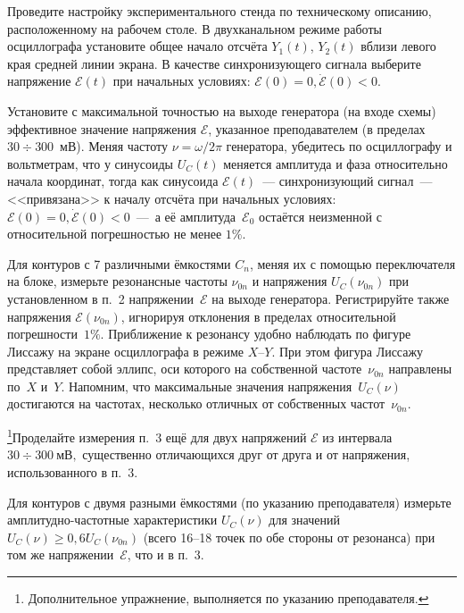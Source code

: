 \begin{lab:task}

\item Проведите настройку экспериментального стенда по техническому описанию, 
расположенному на рабочем столе. В двухканальном режиме работы
осциллографа установите общее начало отсчёта $Y_1(t)$, $Y_2(t)$ вблизи левого края
средней линии экрана. В качестве синхронизующего сигнала выберите напряжение
$\mathcal{E}(t)$ при начальных условиях: $\mathcal{E}(0)=0,
\dot{\mathcal{E}}(0)<0.$

    \item Установите с максимальной точностью на выходе генератора (на входе
схемы) эффективное значение напряжения $\mathcal{E}$, указанное преподавателем (в
пределах $30\div300$~мВ). Меняя частоту $\nu=\omega/2\pi$ генератора, убедитесь по
осциллографу и вольтметрам, что у синусоиды $U_C(t)$ меняется амплитуда и фаза
относительно начала координат, тогда как синусоида
$\mathcal{E}(t)$~--- синхронизующий сигнал~--- <<привязана>> к началу отсчёта
при начальных условиях: $\mathcal{E}(0)=0, \dot{\mathcal{E}}(0)<0$~---~а её
амплитуда~$\mathcal{E}_0$ остаётся неизменной с относительной погрешностью не
менее $1\%$. 

    \item Для контуров с 7 различными ёмкостями $C_n$, меняя их с помощью
переключателя на блоке, измерьте резонансные частоты $\nu_{0n}$ и напряжения
$U_C(\nu_{0n})$ при установленном в п.~2 напряжении~$\mathcal{E}$ на выходе
генератора. Регистрируйте также напряжения $\mathcal{E}(\nu_{0n})$, игнорируя
отклонения в пределах относительной погрешности~$1\%$. Приближение к резонансу
удобно наблюдать по фигуре Лиссажу на экране осциллографа в режиме $X$--$Y$.
При этом фигура Лиссажу представляет собой эллипс, оси которого на собственной
частоте~$\nu_{0n}$ направлены по~$X$ и~$Y$. 
Напомним, что максимальные значения напряжения~$U_C(\nu)$ достигаются на частотах, 
несколько отличных от собственных частот~$\nu_{0n}$.

    \item \footnote{Дополнительное упражнение, выполняется по указанию
        преподавателя.}Проделайте измерения п.~3 ещё
для двух напряжений $\mathcal{E}$ из интервала $30\div 300~мВ,$ существенно
отличающихся друг от друга и от напряжения, использованного в п.~3.

    \item Для контуров с двумя разными ёмкостями (по указанию преподавателя)
измерьте амплитудно-частотные характеристики $U_C(\nu)$ для значений
$U_C(\nu) \ge 0,6 U_C(\nu_{0n})$ (всего 16--18 точек по обе стороны от резонанса)
при том же напряжении~$\mathcal{E}$, что и в п.~3.


\end{lab:task}
